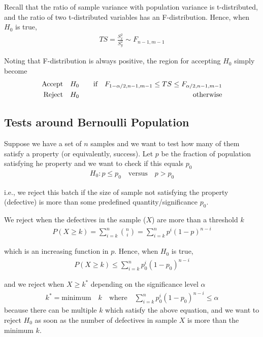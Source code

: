 \documentclass[../probability-notes.tex]{subfiles}
\begin{document}
    Recall that the ratio of sample variance with population variance is t-distributed, and the ratio of two t-distributed variables has an F-distribution. Hence, when $H_{0}$ is true,
    \begin{align*}
        TS = \frac{S_{x}^{2}}{S_{y}^{2}} \sim F_{n-1, m-1}
    \end{align*}

    Noting that F-distribution is always positive, the region for accepting $H_{0}$ simply become
    \begin{alignat*}{2}
        \text{Accept\quad} &H_{0} &\text{\quad if} \quad F_{1-\alpha/2, n-1, m-1} \leq TS \leq F_{\alpha/2, n-1, m-1}\\
        \text{Reject\quad} &H_{0} &\text{\quad otherwise}
    \end{alignat*}

    \subsection{Tests around Bernoulli Population}
    Suppose we have a set of $n$ samples and we want to test how many of them satisfy a property (or equivalently, success). Let $p$ be the fraction of population satisfying he property and we want to check if this equals $p_{0}$
    \begin{align*}
        H_{0}: p \leq p_{0} \quad \text{versus} \quad p > p_{0}
    \end{align*}

    i.e., we reject this batch if the size of sample not satisfying the property (defective) is more than some predefined quantity/significance $p_{0}$.\newline

    We reject when the defectives in the sample ($X$) are more than a threshold $k$
    \begin{align*}
        P(X \geq k) = \sum_{i=k}^{n} \binom{n}{i} = \sum_{i=k}^{n} p^{i}(1-p)^{n-i}
    \end{align*}

    which is an increasing function in $p$. Hence, when $H_{0}$ is true,
    \begin{align*}
        P(X \geq k) \leq \sum_{i=k}^{n} p_{0}^{i}(1-p_{0})^{n-i}
    \end{align*}

    and we reject when $X \geq k^{*}$ depending on the significance level $\alpha$
    \begin{align*}
        k^{*} = \text{minimum}\quad k \quad \text{where} \quad \sum_{i=k}^{n} p_{0}^{i}(1-p_{0})^{n-i} \leq \alpha
    \end{align*}
    because there can be multiple $k$ which satisfy the above equation, and we want to reject $H_{0}$ as soon as the number of defectives in sample $X$ is more than the minimum $k$.\newline
\end{document}
